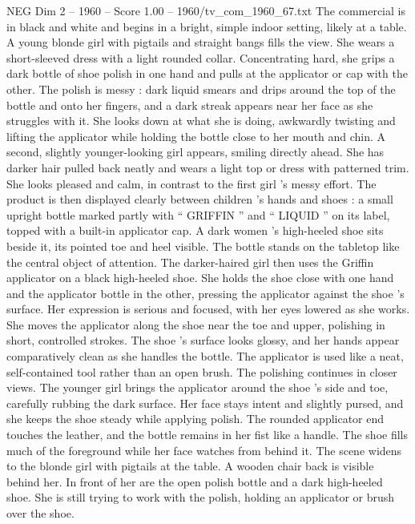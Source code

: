 \begin{textsample}{NEG Dim 2 – 1960 – Score 1.00 – 1960/tv\_com\_1960\_67.txt}  \label{ex:f2_neg_081}
The commercial is in black and white and begins in a bright, simple indoor setting, likely at a table.
A young blonde girl with pigtails and straight bangs fills the view.
She wears a short-sleeved dress with a light rounded collar.
Concentrating hard, she grips a dark bottle of shoe polish in one hand and pulls at the applicator or cap with the other.
The polish is messy : dark liquid smears and drips around the top of the bottle and onto her fingers, and a dark streak appears near her face as she struggles with it.
She looks down at what she is doing, awkwardly twisting and lifting the applicator while holding the bottle close to her mouth and chin.
A second, slightly younger-looking girl appears, smiling directly ahead.
She has darker hair pulled back neatly and wears a light top or dress with patterned trim.
She looks pleased and calm, in contrast to the first girl ’s messy effort.
The product is then displayed clearly between children ’s hands and shoes : a small upright bottle marked partly with “ GRIFFIN ” and “ LIQUID ” on its label, topped with a built-in applicator cap.
A dark women ’s high-heeled shoe sits beside it, its pointed toe and heel visible.
The bottle stands on the tabletop like the central object of attention.
The darker-haired girl then uses the Griffin applicator on a black high-heeled shoe.
She holds the shoe close with one hand and the applicator bottle in the other, pressing the applicator against the shoe ’s surface.
Her expression is serious and focused, with her eyes lowered as she works.
She moves the applicator along the shoe near the toe and upper, polishing in short, controlled strokes.
The shoe ’s surface looks glossy, and her hands appear comparatively clean as she handles the bottle.
The applicator is used like a neat, self-contained tool rather than an open brush.
The polishing continues in closer views.
The younger girl brings the applicator around the shoe ’s side and toe, carefully rubbing the dark surface.
Her face stays intent and slightly pursed, and she keeps the shoe steady while applying polish.
The rounded applicator end touches the leather, and the bottle remains in her fist like a handle.
The shoe fills much of the foreground while her face watches from behind it.
The scene widens to the blonde girl with pigtails at the table.
A wooden chair back is visible behind her.
In front of her are the open polish bottle and a dark high-heeled shoe.
She is still trying to work with the polish, holding an applicator or brush over the shoe.

\end{textsample}
